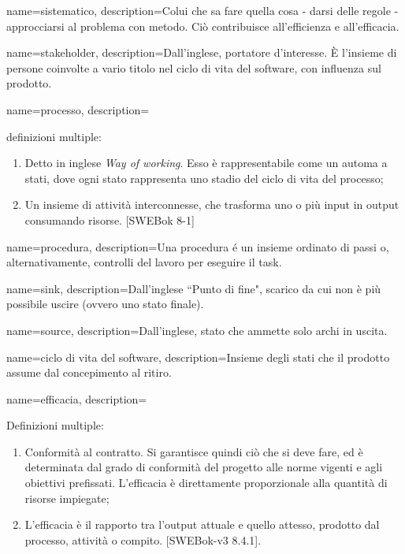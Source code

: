 {
name=sistematico,
description={Colui che sa fare quella cosa - darsi delle regole - approcciarsi al problema con metodo. Ci\`o contribuisce all'efficienza e all'efficacia.}
}

{
name=stakeholder,
description={Dall'inglese, portatore d'interesse. È l'insieme di persone coinvolte a vario titolo nel ciclo di vita del software, con influenza sul prodotto.}
}

{
name=processo, 
description={definizioni multiple:
\begin{enumerate}
\item Detto in inglese \textit{Way of working}. Esso \`e rappresentabile come un automa a stati, dove ogni stato rappresenta uno stadio del ciclo di vita del processo;
\item Un insieme di attività interconnesse, che trasforma uno o più input in output consumando risorse. [SWEBok 8-1]
\end{enumerate}
}
}



{
name=procedura,
description={Una procedura \'e un insieme ordinato di passi o, alternativamente, controlli del lavoro per eseguire il task.}
}


{
name=sink,
description={Dall'inglese ``Punto di fine", scarico da cui non è più possibile uscire (ovvero uno stato finale).}
}

{
name=source,
description={Dall'inglese, stato che ammette solo archi in uscita.}
}

{
name=ciclo di vita del software,
description={Insieme degli stati che il prodotto assume dal concepimento al ritiro.}
}

{
name=efficacia,
description={Definizioni multiple:
\begin{enumerate}
\item Conformit\`a al contratto. Si garantisce quindi ci\`o che si deve fare, ed \`e determinata dal grado di conformit\`a del progetto alle norme vigenti e agli obiettivi prefissati. L'efficacia \`e direttamente proporzionale alla quantit\`a di risorse impiegate;
\item L'efficacia \`e il rapporto tra l'output attuale e quello attesso, prodotto dal processo, attivit\`a o compito. [SWEBok-v3 8.4.1].
\end{enumerate}
}
}


